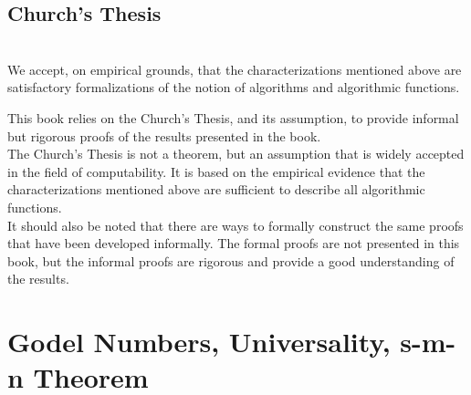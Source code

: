 \documentclass[openany]{book}
\begin{document}
\subsection{Church's Thesis}
\begin{mytheorem}
     \\
    We accept, on empirical  grounds, that the characterizations mentioned above are satisfactory formalizations of the notion of algorithms and algorithmic functions.
\end{mytheorem}
\begin{mynote}
    This book relies on the Church's Thesis, and its assumption, to provide informal but rigorous proofs of the results presented in the book. \\
    The Church's Thesis is not a theorem, but an assumption that is widely accepted in the field of computability. It is based on the empirical evidence that the characterizations mentioned above are sufficient to describe all algorithmic functions.\\
    It should also be noted that there are ways to formally construct the same proofs that have been developed informally. The formal proofs are not presented in this book, but the informal proofs are rigorous and provide a good understanding of the results. 
\end{mynote}
\section{Godel Numbers, Universality, s-m-n Theorem}
\end{document}
